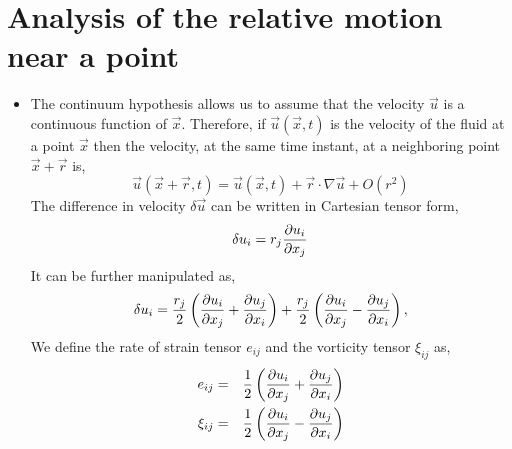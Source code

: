 \section{Analysis of the relative motion near a point}\label{s3}
\begin{itemize}
\item The continuum hypothesis allows us to assume that the velocity $\vec{u}$ is a continuous function of $\vec{x}$. Therefore, if $\vec{u}(\vec{x}, t)$ is the velocity of the fluid at
a point $\vec{x}$ then the velocity, at the same time instant, at a neighboring point $\vec{x} + \vec{r}$ is,
\[
\vec{u}(\vec{x} + \vec{r}, t) = \vec{u}(\vec{x}, t) + \vec{r}\cdot\nabla\vec{u} + O(r^2)
\]
The difference in velocity $\delta\vec{u}$ can be written in Cartesian tensor form,
\[
\delta{u}_i = r_j\frac{\partial{u_i}}{\partial{x_j}}
\]
It can be further manipulated as,
\[
\delta{u}_i = \frac{r_j}{2}\left(\frac{\partial{u_i}}{\partial{x_j}} + \frac{\partial{u_j}}{\partial{x_i}}\right) + \frac{r_j}{2}\left(\frac{\partial{u_i}}{\partial{x_j}} - \frac{\partial{u_j}}{\partial{x_i}}\right),
\]
We define the rate of strain tensor $e_{ij}$ and the vorticity tensor $\xi_{ij}$ as,
\begin{eqnarray*}
e_{ij} &=& \frac{1}{2}\left(\frac{\partial{u_i}}{\partial{x_j}} + \frac{\partial{u_j}}{\partial{x_i}}\right) \\
\xi_{ij} &=& \frac{1}{2}\left(\frac{\partial{u_i}}{\partial{x_j}} - \frac{\partial{u_j}}{\partial{x_i}}\right)
\end{eqnarray*}


\end{itemize}
